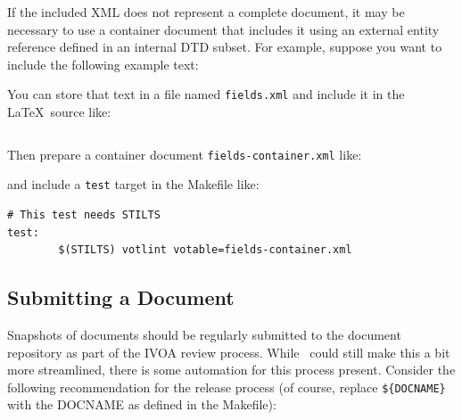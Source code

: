 \documentclass[11pt,a4paper]{ivoa}
\begin{document}
If the included XML does not represent a complete document, it may be
necessary to use a container document that includes it using an
external entity reference defined in an internal DTD subset.
For example, suppose you want to include the following example text:

You can store that text in a file named \verb|fields.xml| and
include it in the \LaTeX\ source like:
\begin{lstlisting}[basicstyle=\footnotesize]

\end{lstlisting}
Then prepare a container document \verb|fields-container.xml| like:

and include a \verb|test| target in the Makefile like:
\begin{lstlisting}[basicstyle=\footnotesize]
# This test needs STILTS
test:
        $(STILTS) votlint votable=fields-container.xml
\end{lstlisting}


\subsection{Submitting a Document}

Snapshots of documents should be regularly submitted to the document
repository as part of the IVOA review process.  While \ivoatex~could
still make this a bit more streamlined, there is some automation for
this process present.  Consider the following recommendation for the
release process (of course, replace \verb|${DOCNAME}| with the DOCNAME
as defined in the Makefile):
\end{document}
